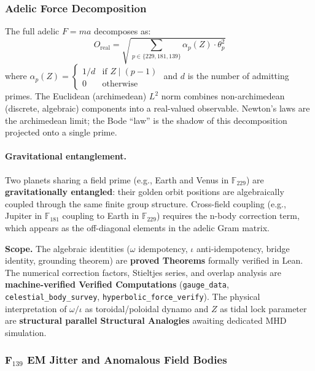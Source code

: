 \subsubsection{Adelic Force Decomposition}

The full adelic $F = ma$ decomposes as:
\begin{equation}
    O_{\text{real}} = \sqrt{\sum_{p \in \{229, 181, 139\}} \alpha_p(Z) \cdot \theta_p^2}
    \label{eq:adelic_force}
\end{equation}
where $\alpha_p(Z) = \begin{cases} 1/d & \text{if } Z \mid (p-1) \\ 0 & \text{otherwise} \end{cases}$ and $d$ is the number of admitting primes. The Euclidean (archimedean) $L^2$ norm combines non-archimedean (discrete, algebraic) components into a real-valued observable. Newton's laws are the archimedean limit; the Bode ``law'' is the shadow of this decomposition projected onto a single prime.

\paragraph{Gravitational entanglement.}
Two planets sharing a field prime (e.g., Earth and Venus in $\mathbb{F}_{229}$) are \textbf{gravitationally entangled}: their golden orbit positions are algebraically coupled through the same finite group structure. Cross-field coupling (e.g., Jupiter in $\mathbb{F}_{181}$ coupling to Earth in $\mathbb{F}_{229}$) requires the n-body correction term, which appears as the off-diagonal elements in the adelic Gram matrix.

\textbf{Scope.} The algebraic identities ($\omega$ idempotency, $\iota$ anti-idempotency, bridge identity, grounding theorem) are \textbf{proved Theorems} formally verified in Lean. The numerical correction factors, Stieltjes series, and overlap analysis are \textbf{machine-verified Verified Computations} (\texttt{gauge\_data}, \texttt{celestial\_body\_survey}, \texttt{hyperbolic\_force\_verify}). The physical interpretation of $\omega/\iota$ as toroidal/poloidal dynamo and $Z$ as tidal lock parameter are \textbf{structural parallel Structural Analogies} awaiting dedicated MHD simulation.

\subsubsection{F$_{139}$ EM Jitter and Anomalous Field Bodies}
\label{sec:f139_jitter}

